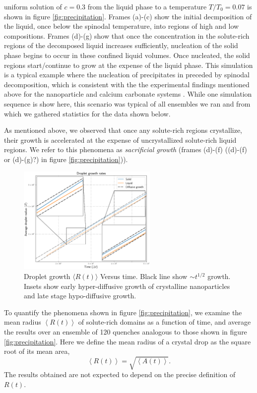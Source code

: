 \documentclass[showkeys, prb, reprint]{revtex4-1}
\newcommand{\mean}[1]{\left\langle #1 \right\rangle}
\begin{document}
uniform solution of $c = 0.3$ from the liquid phase to a temperature $T/T_0 =
0.07$ is shown in figure \ref{fig:precipitation}.  Frames (a)-(c) show the
initial decmposition of the liquid, once below the spinodal temperature, into
regions of high and low compositions. Frames (d)-(g) show that once the
concentration in the solute-rich regions of the decomposed liquid {\color{red}increases sufficiently,} nucleation of the solid phase begins to occur in these confined liquid volumes. Once nucleated, the solid regions start/continue to grow at the expense of the
liquid phase. This simulation is a typical example where the nucleation of
precipitates in preceded by spinodal decomposition, which is consistent with
the  the experimental findings mentioned above for the nanoparticle and calcium
carbonate systems \cite{LOH17, WALLACE13}. While one simulation sequence is
show here, this scenario was typical of all ensembles we ran and from which we
gathered statistics for the data shown below. 

As mentioned above, we observed
that once any solute-rich regions crystallize, their growth is accelerated at
the expense of uncrystallized solute-rich liquid regions. We refer to this phenomena
as \textit{sacrificial growth} (frames (d)-(f) {\color{red}((d)-(f) or (d)-(g)?)} in figure \ref{fig:precipitation})). 
%
\begin{figure}
    \centering
    \includegraphics[width=0.6\textwidth]{scaling}
    \caption{
        \label{fig:scaling}
        Droplet growth $\langle R(t) \rangle$ Versus time. Black line show
        $\sim t^{1/2}$ growth. Insets show early hyper-diffusive growth
        of crystalline nanoparticles and late stage hypo-diffusive growth.
    }
\end{figure}
%
%
To quantify the phenomena shown in figure \ref{fig:precipitation}, we examine
the mean radius $\mean{R(t)}$ of solute-rich domains as a function of time, and
average the results over an ensemble of 120 quenches analogous to those shown in 
figure \ref{fig:precipitation}. Here we define the mean
radius of {\color{red} a crystal drop as the square root of its mean area},
%
\begin{equation}
    \mean{R(t)} = \sqrt{\mean{A(t)}}.
\end{equation}
%
The results obtained are not expected to depend on the precise definition of
$R(t)$.
\end{document}

